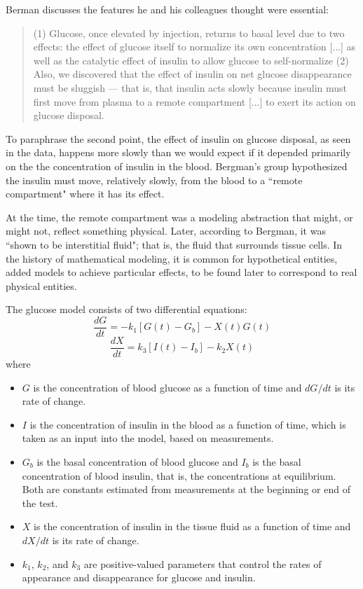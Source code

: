 \documentclass[12pt]{book}
\theoremstyle{exercise}
\begin{document}
Berman discusses the features he and his colleagues thought were essential:

\begin{quote}
(1) Glucose, once elevated by injection, returns to basal level due to
two effects: the effect of glucose itself to normalize its own
concentration [...] as well as the catalytic effect of insulin to allow
glucose to self-normalize (2) Also, we discovered
that the effect of insulin on net glucose disappearance
must be sluggish --- that is, that insulin acts slowly because
insulin must first move from plasma to a remote compartment [...] to exert its action on glucose disposal.
\end{quote}

To paraphrase the second point, the effect of insulin on glucose disposal, as seen in the data, happens more slowly than we would expect if it depended primarily on the the concentration of insulin in the blood.  Bergman's group hypothesized the insulin must move, relatively slowly, from the blood to a ``remote compartment" where it has its effect.

At the time, the remote compartment was a modeling abstraction that might, or might not, reflect something physical.  Later, according to Bergman, it was ``shown to be interstitial fluid"; that is, the fluid that surrounds tissue cells.  In the history of mathematical modeling, it is common for hypothetical entities, added models to achieve particular effects, to be found later to correspond to real physical entities.

The glucose model consists of two differential equations:
%
\[ \frac{dG}{dt} = -k_1 \left[ G(t) - G_b \right] - X(t) G(t)  \]
%
\[ \frac{dX}{dt} = k_3 \left[I(t) - I_b \right] - k_2 X(t) \]
%
where

\begin{itemize}

\item $G$ is the concentration of blood glucose as a function of time and $dG/dt$ is its rate of change.

\item $I$ is the concentration of insulin in the blood as a function of time, which is taken as an input into the model, based on measurements.

\item $G_b$ is the basal concentration of blood glucose and $I_b$ is the basal concentration of blood insulin, that is, the concentrations at equilibrium.  Both are constants estimated from measurements at the beginning or end of the test.

\item $X$ is the concentration of insulin in the tissue fluid as a function of time and $dX/dt$ is its rate of change.

\item $k_1$, $k_2$, and $k_3$ are positive-valued parameters that control the rates of appearance and disappearance for glucose and insulin. 

\end{itemize}
\end{document}
